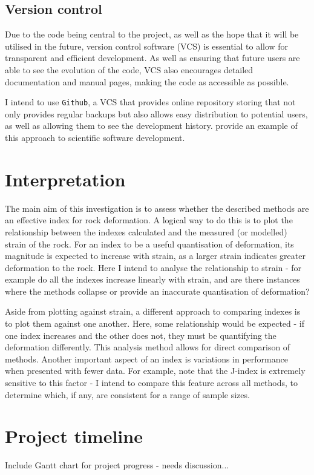 \documentclass[a4paper,11pt]{article}
\numberwithin{equation}{section}
\begin{document}
\subsection{Version control}
Due to the code being central to the project, as well as the hope that it will be utilised in the future, version control software (VCS) is essential to allow for transparent and efficient development. As well as ensuring that future users are able to see the evolution of the code, VCS also encourages detailed documentation and manual pages, making the code as accessible as possible.

I intend to use \texttt{Github}, a VCS that provides online repository storing that not only provides regular backups but also allows easy distribution to potential users, as well as allowing them to see the development history. \cite{Walker} provide an example of this approach to scientific software development.

\section{Interpretation} \label{sec:interp}
The main aim of this investigation is to assess whether the described methods are an effective index for rock deformation. A logical way to do this is to plot the relationship between the indexes calculated and the measured (or modelled) strain of the rock. For an index to be a useful quantisation of deformation, its magnitude is expected to increase with strain, as a larger strain indicates greater deformation to the rock. Here I intend to analyse the relationship to strain - for example do all the indexes increase linearly with strain, and are there instances where the methods collapse or provide an inaccurate quantisation of deformation?

Aside from plotting against strain, a different approach to comparing indexes is to plot them against one another. Here, some relationship would be expected - if one index increases and the other does not, they must be quantifying the deformation differently. This analysis method allows for direct comparison of methods. Another important aspect of an index is variations in performance when presented with fewer data. For example, \cite{Skemer} note that the J-index is extremely sensitive to this factor - I intend to compare this feature across all methods, to determine which, if any, are consistent for a range of sample sizes. 

\section{Project timeline}
Include Gantt chart for project progress - needs discussion...



\end{document}
